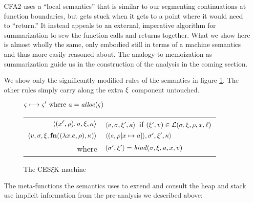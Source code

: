 \documentclass{llncs}
\begin{document}
CFA2 uses a ``local semantics'' that is similar to our segmenting
continuations at function boundaries, but gets stuck when it gets to a
point where it would need to ``return.'' It instead appeals to an
external, imperative algorithm for summarization to sew the function
calls and returns together. What we show here is almost wholly the
same, only embodied still in terms of a machine semantics and thus
more easily reasoned about. The analogy to memoization as
summarization guide us in the construction of the analysis in the
coming section.

We show only the significantly modified rules of the semantics in
figure \ref{fig:frame-semantics}. The other rules simply carry along
the extra $\mframe$ component untouched.
\begin{figure}
  \centering
  $\mstate \stepto \mstate' \text{ where } \maddr = \alloc(\mstate)$ \\
  \begin{tabular}{r|l}
    \hline
    $\tpl{(\svar[\mlab]{\mvar}, \menv), \mstore, \mframe, \mkont}$
    &
    $\tpl{\mval,\mstore,\mframe',\mkont}$ if $(\mframe', \mval) \in \lookup(\mstore,\mframe,\menv,\mvar,\mlab)$
    \\
    $\tpl{\mval,\mstore,\mframe,\kfn{\vclo{\slam{\mvar}{\mexpr}}{\menv}, \mkont}}$
    &
    $\tpl{(\mexpr, \extm{\menv}{\mvar}{\maddr}), \mstore', \mframe', \mkont}$
    \\ where & $(\mstore',\mframe') = \bind(\mstore,\mframe,\maddr,\mvar,\mval)$
  \end{tabular}
  \caption{The CES$\xi$K machine}
  \label{fig:frame-semantics}
\end{figure}

The meta-functions the semantics uses to extend and consult the heap
and stack use implicit information from the pre-analysis we described
above:
\end{document}
